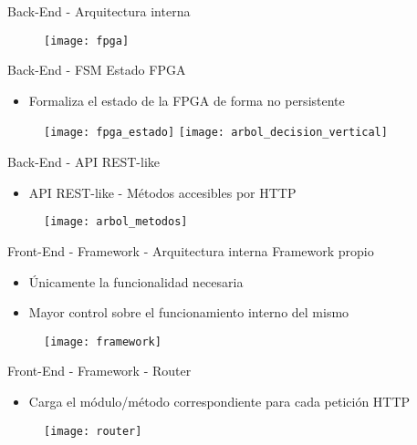 \begin{frame}{Back-End - Arquitectura interna}
  \begin{figure}
    \texttt{[image: fpga]}
  \end{figure}
\end{frame}

\begin{frame}{Back-End - FSM Estado FPGA}
  \begin{itemize}
    \item Formaliza el estado de la FPGA de forma no persistente
  \end{itemize}
  \begin{figure}
    \texttt{[image: fpga\_estado]}
    \hfill
    \texttt{[image: arbol\_decision\_vertical]}
  \end{figure}
\end{frame}

\begin{frame}{Back-End - API REST-like}
  \begin{itemize}
    \item API REST-like - Métodos accesibles por HTTP
  \end{itemize}
  \begin{figure}
    \texttt{[image: arbol\_metodos]}
  \end{figure}
\end{frame}

\begin{frame}{Front-End - Framework - Arquitectura interna}
  Framework propio
  \begin{itemize}
    \item Únicamente la funcionalidad necesaria
    \item Mayor control sobre el funcionamiento interno del mismo
  \end{itemize}
  \begin{figure}
    \texttt{[image: framework]}
  \end{figure}
\end{frame}

\begin{frame}{Front-End - Framework - Router}
  \begin{itemize}
    \item Carga el módulo/método correspondiente para cada petición HTTP
  \end{itemize}
  \begin{figure}
    \texttt{[image: router]}
  \end{figure}
\end{frame}

